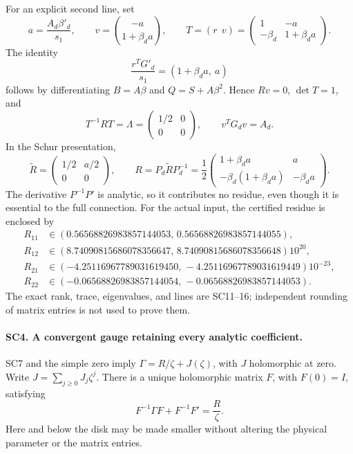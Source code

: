 \documentclass[11pt,a4paper]{article}
\theoremstyle{definition}\newtheorem{definition}[theorem]{Definition}
\begin{document}
For an explicit second line, set
\[
 a=\frac{A_d\beta'_d}{s_1},\qquad
 v=\binom{-a}{1+\beta_da},\qquad
 T=(r\ \ v)=
 \begin{pmatrix}1&-a\\-\beta_d&1+\beta_da\end{pmatrix}.
 \tag{SC13}
\]
The identity
\[
 \frac{r^TG'_d}{s_1}=(1+\beta_da,\ a)
 \tag{SC14}
\]
follows by differentiating \(B=A\beta\) and
\(Q=S+A\beta^2\). Hence \(Rv=0\), \(\det T=1\), and
\[
 T^{-1}RT=\Lambda=\begin{pmatrix}1/2&0\\0&0\end{pmatrix},
 \qquad v^TG_dv=A_d.
 \tag{SC15}
\]
In the Schur presentation,
\[
 \widetilde R=
 \begin{pmatrix}1/2&a/2\\0&0\end{pmatrix},\qquad
 R=P_d\widetilde RP_d^{-1}
 =\frac12\begin{pmatrix}
 1+\beta_da&a\\-\beta_d(1+\beta_da)&-\beta_da
 \end{pmatrix}.
 \tag{SC16}
\]
The derivative \(P^{-1}P'\) is analytic, so it contributes no
residue, even though it is essential to the full connection.
For the actual input, the certified residue is enclosed by
\[
\begin{aligned}
 R_{11}&\in(0.56568826983857144053,\,0.56568826983857144055),\\
 R_{12}&\in(8.74090815686078356647,\,8.74090815686078356648)10^{20},\\
 R_{21}&\in(-4.25116967789031619450,\,-4.25116967789031619449)10^{-23},\\
 R_{22}&\in(-0.06568826983857144054,\,-0.06568826983857144053).
\end{aligned}
 \tag{SC17}
\]
The exact rank, trace, eigenvalues, and lines are SC11--16;
independent rounding of matrix entries is not used to prove them.

\paragraph{SC4. A convergent gauge retaining every analytic coefficient.}
SC7 and the simple zero imply
\(\Gamma=R/\zeta+J(\zeta)\), with \(J\) holomorphic at zero.
Write \(J=\sum_{j\ge0}J_j\zeta^j\).
There is a unique holomorphic matrix \(F\), with \(F(0)=I\),
satisfying
\[
 F^{-1}\Gamma F+F^{-1}F'=\frac R\zeta .
 \tag{SC18}
\]
Here and below the disk may be made smaller without altering the
physical parameter or the matrix entries.
\end{document}
